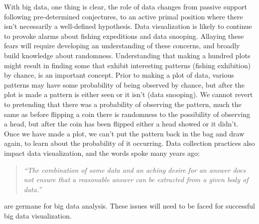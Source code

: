 \documentclass[11pt]{article}
\begin{document}
With big data, one thing is clear, the role of data changes from passive support following pre-determined conjectures, to an active primal position where there isn't necessarily a well-defined hypothesis. Data visualization is likely to continue to provoke alarms about fishing expeditions and data snooping. Allaying these fears will require developing an understanding of these concerns, and broadly build knowledge about randomness. Understanding that making a hundred plots might result in finding some that exhibit interesting patterns (fishing exhibition) by chance, is an important concept. Prior to making a plot of data, various patterns may have some probability of being observed by chance, but after the plot is made a pattern is either seen or it isn't (data snooping).  We cannot revert to pretending that there was a probability of observing the pattern, much the same as before flipping a coin there is randomness to the possibility of observing a head, but after the coin has been flipped either a head showed or it didn't. Once we have made a plot, we can't put the pattern back in the bag and draw again, to learn about the probability of it occurring. Data collection practices also impact data visualization, and the words \citet{Tukey1986} spoke many years ago:

\begin{quote}
{\em ``The combination of some data and an aching desire for an answer does not ensure that a reasonable answer can be extracted from a given body of data.''} \
\end{quote}\vspace*{-0.2cm}

\noindent are germane for big data analysis. These issues will need to be faced for successful big data visualization.




\end{document}
